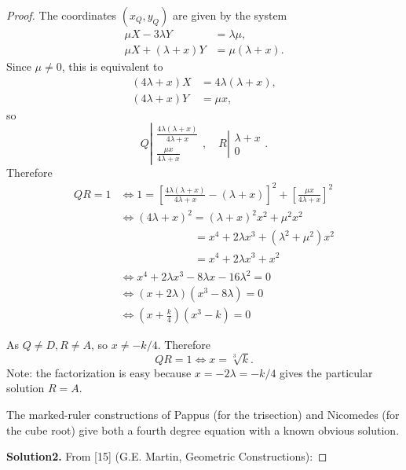 \documentclass[11pt,a4paper]{article}
\begin{document}
\begin{proof}
The coordinates $(x_Q,y_Q)$ are given by the system
\begin{align*}
\mu X - 3 \lambda Y &= \lambda \mu,\\
\mu X + (\lambda + x) Y &= \mu (\lambda +x).
\end{align*}
Since $\mu \ne 0$, this is equivalent to
\begin{align*}
(4\lambda + x) X &= 4\lambda(\lambda + x),\\
(4\lambda + x) Y &= \mu x,
\end{align*}
so
$$ Q\left | 
\begin{array}{c}
\frac{4 \lambda (\lambda + x)}{4\lambda +x}\\
\frac{\mu x}{4\lambda +x}
\end{array}
\right.
, \quad 
R \left | 
\begin{array}{c}
  \lambda + x\\
 0 
\end{array}
\right.
.
$$
Therefore 
\begin{align*}
QR = 1 &\iff 1 =  \left [ \frac{4 \lambda (\lambda + x)}{4\lambda +x} - (\lambda + x) \right ]^2 + \left [ \frac{\mu x}{4\lambda +x} \right]^2 \\
&\iff (4 \lambda + x)^2 = (\lambda + x)^2 x^2 + \mu^2 x^2\\
&\phantom{\iff (4 \lambda + x)^2\, } = x^4+ 2\lambda x^3 +( \lambda^2 + \mu ^2) x^2\\
&\phantom{\iff (4 \lambda + x)^2\, } = x^4 + 2 \lambda x^3 + x^2\\
&\iff x^4 + 2\lambda x^3 - 8 \lambda x - 16 \lambda^2 = 0\\
& \iff (x+ 2 \lambda)(x^3 - 8 \lambda) = 0\\
&\iff \left (x+ \frac{k}{4} \right)(x^3 - k)=0
\end{align*}

As $Q \ne D, R \ne A$, so $x \ne -k/4$. Therefore
$$QR = 1 \iff x = \sqrt[3]{k}.$$
Note: the factorization is easy because $x = -2 \lambda = -k/4$ gives the particular solution $R = A$.

The marked-ruler constructions of Pappus (for the trisection) and Nicomedes (for the cube root) give both a fourth degree equation with a known obvious solution.

	\item[{\bf Solution2.}]  From  [15] (G.E. Martin, Geometric Constructions):
	

\end{proof}
\end{document}
